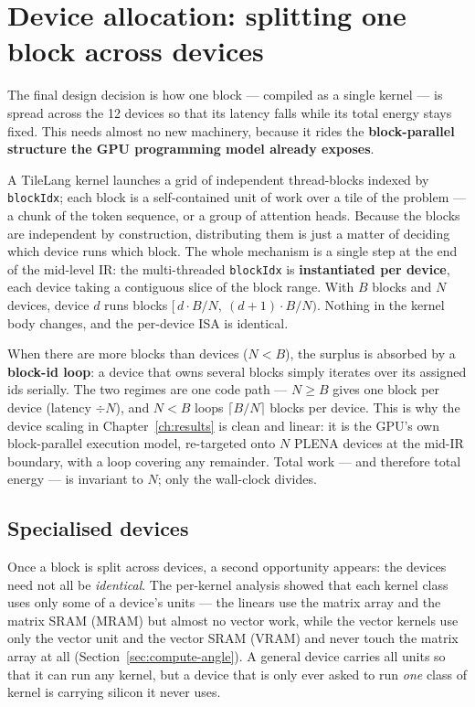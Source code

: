 \documentclass[11pt]{report}
\begin{document}
\section{Device allocation: splitting one block across devices}
\label{sec:device-alloc}

The final design decision is how one block --- compiled as a single kernel
--- is spread across the 12 devices so that its latency falls while its
total energy stays fixed. This needs almost no new machinery, because it
rides the \textbf{block-parallel structure the GPU programming model
already exposes}.

A TileLang kernel launches a grid of independent thread-blocks indexed by
\texttt{blockIdx}; each block is a self-contained unit of work over a tile
of the problem --- a chunk of the token sequence, or a group of attention
heads. Because the blocks are independent by construction, distributing
them is just a matter of deciding which device runs which block. The whole
mechanism is a single step at the end of the mid-level IR: the
multi-threaded \texttt{blockIdx} is \textbf{instantiated per device}, each
device taking a contiguous slice of the block range. With $B$ blocks and
$N$ devices, device $d$ runs blocks $[\,d\cdot B/N,\ (d{+}1)\cdot B/N)$.
Nothing in the kernel body changes, and the per-device ISA is identical.

When there are more blocks than devices ($N < B$), the surplus is absorbed
by a \textbf{block-id loop}: a device that owns several blocks simply
iterates over its assigned ids serially. The two regimes are one code path
--- $N \ge B$ gives one block per device (latency $\div N$), and $N < B$
loops $\lceil B/N\rceil$ blocks per device. This is why the device scaling
in Chapter~\ref{ch:results} is clean and linear: it is the GPU's own
block-parallel execution model, re-targeted onto $N$ PLENA devices at the
mid-IR boundary, with a loop covering any remainder. Total work --- and
therefore total energy --- is invariant to $N$; only the wall-clock divides.

\subsection{Specialised devices}
\label{sec:specialised-devices}

Once a block is split across devices, a second opportunity appears: the
devices need not all be \emph{identical}. The per-kernel analysis showed that
each kernel class uses only some of a device's units --- the linears use the
matrix array and the matrix SRAM (MRAM) but almost no vector work, while the
vector kernels use only the vector unit and the vector SRAM (VRAM) and never
touch the matrix array at all (Section~\ref{sec:compute-angle}). A general
device carries all units so that it can run any kernel, but a device that is
only ever asked to run \emph{one} class of kernel is carrying silicon it
never uses.
\end{document}
